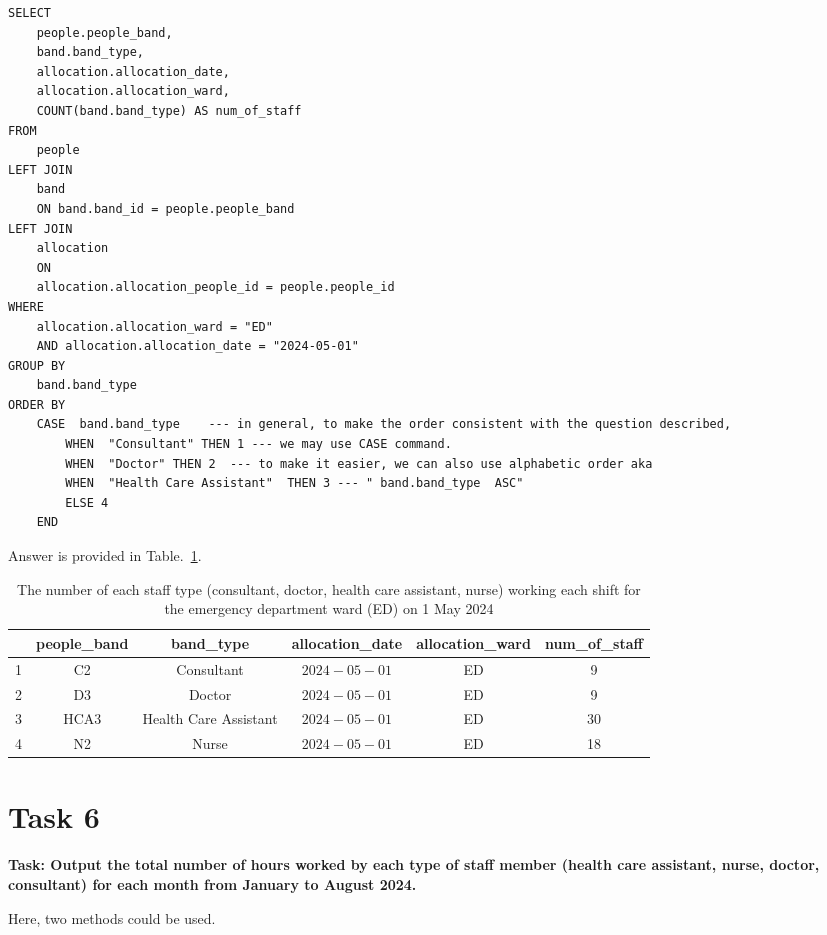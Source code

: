 \documentclass{article}
\begin{document}
\begin{lstlisting}[style=sqlstyle]
SELECT 
    people.people_band,
    band.band_type,
    allocation.allocation_date,
    allocation.allocation_ward,
    COUNT(band.band_type) AS num_of_staff
FROM
    people
LEFT JOIN
    band
    ON band.band_id = people.people_band
LEFT JOIN
    allocation
    ON
    allocation.allocation_people_id = people.people_id
WHERE
    allocation.allocation_ward = "ED"
    AND allocation.allocation_date = "2024-05-01"
GROUP BY
    band.band_type
ORDER BY
    CASE  band.band_type    --- in general, to make the order consistent with the question described, 
        WHEN  "Consultant" THEN 1 --- we may use CASE command.
        WHEN  "Doctor" THEN 2  --- to make it easier, we can also use alphabetic order aka
        WHEN  "Health Care Assistant"  THEN 3 --- " band.band_type  ASC"
        ELSE 4
    END
\end{lstlisting}

Answer is provided in Table.~\ref{tab:task5}.

\begin{table}[htbp]
    \centering
\begin{tabular}{|c|c|c|c|c|c|}
\hline & people\_band & \multicolumn{1}{|c|}{ band\_type } & allocation\_date & allocation\_ward & num\_of\_staff \\
\hline 1 & C2 & Consultant & $2024-05-01$ & ED & 9 \\
\hline 2 & D3 & Doctor & $2024-05-01$ & ED & 9 \\
\hline 3 & HCA3 & Health Care Assistant & $2024-05-01$ & ED & 30 \\
\hline 4 & N2 & Nurse & $2024-05-01$ & ED & 18 \\
\hline
\end{tabular}
   \caption{The number of each staff type (consultant, doctor, health care assistant, nurse) working each shift for the emergency department ward (ED) on 1 May 2024}
    \label{tab:task5}
\end{table}

\section{Task 6}

\textbf{Task: Output the total number of hours worked by each type of staff member (health care assistant, nurse, doctor, consultant) for each month from January to August 2024.}

Here, two methods could be used. 
\end{document}
